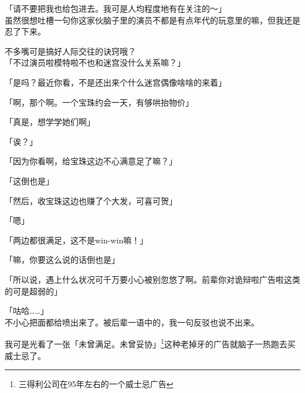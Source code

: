 「请不要把我也给包进去。我可是人均程度地有在关注的～」\\

虽然很想吐槽一句你这家伙脑子里的演员不都是有点年代的玩意里的嘛，但我还是忍了下来。

不多嘴可是搞好人际交往的诀窍哦？\\

「不过演员啦模特啦不也和迷宫没什么关系嘛？」

「是吗？最近你看，不是还出来个什么迷宫偶像啥啥的来着」

「啊，那个啊。一个宝珠约会一天，有够哄抬物价」

「真是，想学学她们啊」

「诶？」

「因为你看啊，给宝珠这边不心满意足了嘛？」

「这倒也是」

「然后，收宝珠这边也赚了个大发，可喜可贺」

「嗯」

「两边都很满足，这不是win-win嘛！」

「嘛，你要这么说的话倒也是」

「所以说，遇上什么状况可千万要小心被别忽悠了啊。前辈你对诡辩啦广告啦这类的可是超弱的」

「咕哈……」\\

不小心把面都给喷出来了。被后辈一语中的，我一句反驳也说不出来。

我可是光看了一张「未曾满足。未曾妥协」\footnote{三得利公司在95年左右的一个威士忌广告}这种老掉牙的广告就脑子一热跑去买威士忌了。

